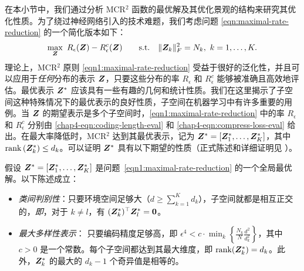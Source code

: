 \documentclass[../../book-main_zh.tex]{subfiles}
\begin{document}
在本小节中，我们通过分析 MCR$^2$ 函数的最优解及其优化景观的结构来研究其优化性质。为了绕过神经网络引入的技术难题，我们考虑问题 \eqref{eqn:maximal-rate-reduction} 的一个简化版本如下：
\begin{align}\label{eqn1:maximal-rate-reduction}
    \max_{\bm Z}\ R_{\epsilon}(\bm{Z}) - R_{\epsilon}^c(\bm{Z})\qquad \mathrm{s.t.}\quad \|\bm Z_k\|_F^2 = N_k,\ k =1,\dots,K. 
\end{align}
理论上，MCR$^2$ 原则 \eqref{eqn1:maximal-rate-reduction} 受益于很好的泛化性，并且可以应用于{\em 任何}分布的表示 $\bm{Z}$，只要这些分布的率 $R_\epsilon$ 和 $R^c_\epsilon$ 能够被准确且高效地评估。最优表示 $\bm{Z}^{\ast}$ 应该具有一些有趣的几何和统计性质。我们在这里揭示了子空间这种特殊情况下的最优表示的良好性质，子空间在机器学习中有许多重要的用例。当 $\bm{Z}$ 的期望表示是多个子空间时，\eqref{eqn1:maximal-rate-reduction} 中的率 $R_\epsilon$ 和 $R^c_\epsilon$ 分别由 \eqref{chap4-eqn:coding-length-eval} 和 \eqref{chap4-eqn:compress-loss-eval} 给出。在最大率降低时，MCR$^2$ 达到其最优表示，记为 $\bm{Z}^{\ast} = [\bm{Z}_1^*,\dots,\bm{Z}_K^*]$，其中 $\operatorname{rank}{(\bm{Z}_{k}^*)}\le d_k$。可以证明 $\bm{Z}^{\ast}$ 具有以下期望的性质（正式陈述和详细证明见 \cite{yu2020learning}）。

\begin{theorem}[\bf 全局最优解的刻画]
	假设 $\bm{Z}^{\ast} = [\bm{Z}_1^*,\dots,\bm{Z}_K^*]$ 是问题~\eqref{eqn1:maximal-rate-reduction} 的一个全局最优解。以下陈述成立：
	\begin{itemize}
		\item {\em 类间判别性}：只要环境空间足够大（$d \ge \sum_{k=1}^{K} d_k$），子空间就都是相互正交的，{\em 即}，对于 $k \not= l$，有 $(\bm{Z}_{k}^*)^{\top} \bm{Z}_{l}^* = \bm{0}$。
		\item {\em 最大多样性表示}：
		      只要编码精度足够高，即 $\epsilon ^4 < c\cdot \min_{k}\left\{ \frac{N_k}{N}\frac{d^2}{d_k^2}\right\}$，其中 $c>0$ 是一个常数。每个子空间都达到其最大维度，即 $\mathrm{rank}{(\bm{Z}_{k}^*)}= d_k$。此外，$\bm{Z}_{k}^*$ 的最大的 $d_k-1$ 个奇异值是相等的。
		      \label{thm:MCR2-properties}
	\end{itemize}
\end{theorem}

\end{document}
